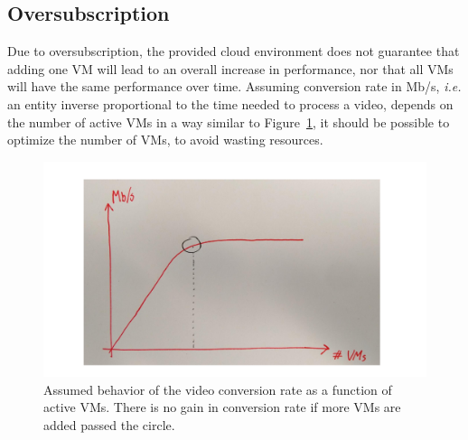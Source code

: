 \documentclass[a4paper, 10pt, english]{article}
\begin{document}
\subsection{Oversubscription}
Due to oversubscription, the provided cloud environment does not guarantee that adding one VM will lead to an overall increase in performance, nor that all VMs will have the same performance over time. Assuming conversion rate in Mb/s, \emph{i.e.} an entity inverse proportional to the time needed to process a video, depends on the number of active VMs in a way similar to Figure~\ref{fig:vmvsMbs}, it should be possible to optimize the number of VMs, to avoid wasting resources.
\begin{figure}
	\label{fig:vmvsMbs}
	\centering
	\includegraphics[width=.6\textwidth]{figs/vmvsMbs.pdf}
	\caption{Assumed behavior of the video conversion rate as a function of active VMs. There is no gain in conversion rate if more VMs are added passed the circle.}
\end{figure}
\end{document}
